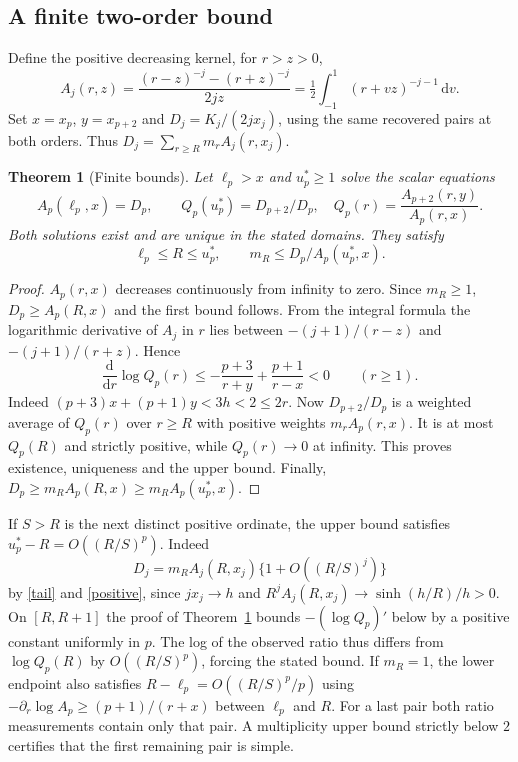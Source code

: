 \documentclass[11pt,letterpaper]{article}
\newtheorem{theorem}{Theorem}
\newcommand{\dd}{\mathrm d}
\numberwithin{equation}{section}
\begin{document}
\subsection*{A finite two-order bound}
Define the positive decreasing kernel, for $r>z>0$,
\[
 A_j(r,z)=\frac{(r-z)^{-j}-(r+z)^{-j}}{2jz}
         =\tfrac12\int_{-1}^1(r+vz)^{-j-1}\,\dd v .
\]
Set $x=x_p$, $y=x_{p+2}$ and $D_j=K_j/(2j x_j)$, using the same recovered
pairs at both orders. Thus $D_j=\sum_{r\ge R}m_r A_j(r,x_j)$.
\begin{theorem}[Finite bounds]\label{bounds}
Let $\ell_p>x$ and $u_p^*\ge1$ solve the scalar equations
\[
 A_p(\ell_p,x)=D_p,\qquad
 Q_p(u_p^*)=D_{p+2}/D_p,\quad
 Q_p(r)=\frac{A_{p+2}(r,y)}{A_p(r,x)} .
\]
Both solutions exist and are unique in the stated domains. They satisfy
\[
     \ell_p\le R\le u_p^*,\qquad
           m_R\le D_p/A_p(u_p^*,x).
\]
\end{theorem}
\newpage
\begin{proof}
$A_p(r,x)$ decreases continuously from infinity to zero.
Since $m_R\ge1$, $D_p\ge A_p(R,x)$ and the first bound follows. From
the integral formula the logarithmic derivative of $A_j$ in $r$ lies
between $-(j+1)/(r-z)$ and $-(j+1)/(r+z)$. Hence
\[
 \frac{\dd}{\dd r}\log Q_p(r)
 \le-\frac{p+3}{r+y}+\frac{p+1}{r-x}<0\qquad(r\ge1).
\]
Indeed $(p+3)x+(p+1)y<3h<2\le2r$.
Now $D_{p+2}/D_p$ is a weighted average of $Q_p(r)$ over $r\ge R$
with positive weights $m_r A_p(r,x)$. It is at most $Q_p(R)$ and
strictly positive, while $Q_p(r)\to0$ at infinity. This proves existence,
uniqueness and the upper bound. Finally,
$D_p\ge m_R A_p(R,x)\ge m_R A_p(u_p^*,x)$.
\end{proof}

If $S>R$ is the next distinct positive ordinate, the upper bound satisfies
$u_p^*-R=O((R/S)^p)$. Indeed
\[
 D_j=m_R A_j(R,x_j)\{1+O((R/S)^j)\}
\]
by \eqref{tail} and \eqref{positive}, since $jx_j\to h$ and
$R^j A_j(R,x_j)\to\sinh(h/R)/h>0$. On $[R,R+1]$ the proof of
Theorem~\ref{bounds} bounds $-(\log Q_p)'$ below by a positive constant
uniformly in $p$. The log of the observed ratio thus differs from
$\log Q_p(R)$ by $O((R/S)^p)$, forcing the stated bound. If $m_R=1$,
the lower endpoint also satisfies $R-\ell_p=O((R/S)^p/p)$ using
$-\partial_r\log A_p\ge(p+1)/(r+x)$ between $\ell_p$ and $R$.
For a last pair both ratio measurements contain only that pair.
A multiplicity upper bound strictly below $2$ certifies that the first
remaining pair is simple.
\end{document}
